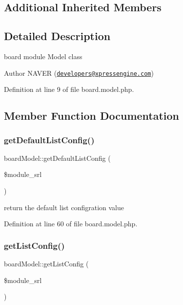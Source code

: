 \subsection*{Additional Inherited Members}


\subsection{Detailed Description}
board module Model class 

\begin{DoxyAuthor}{Author}
N\+A\+V\+ER (\href{mailto:developers@xpressengine.com}{\tt developers@xpressengine.\+com}) 
\end{DoxyAuthor}


Definition at line 9 of file board.\+model.\+php.



\subsection{Member Function Documentation}
\mbox{\label{classboardModel_ac4e077b35257fffc1dc3af0a771f20fa}} 
\subsubsection{\texorpdfstring{get\+Default\+List\+Config()}{getDefaultListConfig()}}
{\footnotesize\ttfamily board\+Model\+::get\+Default\+List\+Config (\begin{DoxyParamCaption}\item[{}]{\$module\+\_\+srl }\end{DoxyParamCaption})}



return the default list configration value 



Definition at line 60 of file board.\+model.\+php.

\mbox{\label{classboardModel_acbcd8af2157f310556985b8c720969ab}} 
\subsubsection{\texorpdfstring{get\+List\+Config()}{getListConfig()}}
{\footnotesize\ttfamily board\+Model\+::get\+List\+Config (\begin{DoxyParamCaption}\item[{}]{\$module\+\_\+srl }\end{DoxyParamCaption})}




